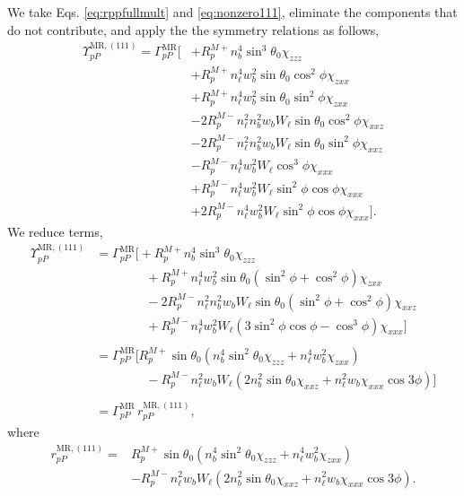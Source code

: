 We take Eqs. \eqref{eq:rppfullmult} and \eqref{eq:nonzero111}, eliminate the
components that do not contribute, and apply the the symmetry relations as
follows,
\begin{equation*}
\begin{split}
\Upsilon^{\mathrm{MR},(111)}_{pP} =
\Gamma^{\mathrm{MR}}_{pP}
\big[
&+ R^{M+}_{p}n^{4}_{b}\sin^{3}\theta_{0}\chi_{zzz}\\
&+ R^{M+}_{p}n^{4}_{\ell}w^{2}_{b}\sin\theta_{0}\cos^{2}\phi\chi_{zxx}\\
&+ R^{M+}_{p}n^{4}_{\ell}w^{2}_{b}\sin\theta_{0}\sin^{2}\phi\chi_{zxx}\\
&- 2R^{M-}_{p}n^{2}_{\ell}n^{2}_{b}w_{b}W_{\ell}\sin\theta_{0}\cos^{2}\phi
   \chi_{xxz}\\
&- 2R^{M-}_{p}n^{2}_{\ell}n^{2}_{b}w_{b}W_{\ell}\sin\theta_{0}\sin^{2}\phi
   \chi_{xxz}\\
&- R^{M-}_{p}n^{4}_{\ell}w^{2}_{b}W_{\ell}\cos^{3}\phi\chi_{xxx}\\
&+ R^{M-}_{p}n^{4}_{\ell}w^{2}_{b}W_{\ell}\sin^{2}\phi\cos\phi\chi_{xxx}\\
&+ 2R^{M-}_{p}n^{4}_{\ell}w^{2}_{b}W_{\ell}\sin^{2}\phi\cos\phi\chi_{xxx}
\big].
\end{split}
\end{equation*}
We reduce terms,
\begin{equation*}
\begin{split}
\Upsilon^{\mathrm{MR},(111)}_{pP} &=
\Gamma^{\mathrm{MR}}_{pP}
\big[
+ R^{M+}_{p}n^{4}_{b}\sin^{3}\theta_{0}\chi_{zzz}\\
&\qquad\qquad+ R^{M+}_{p}n^{4}_{\ell}w^{2}_{b}\sin\theta_{0}
   (\sin^{2}\phi+\cos^{2}\phi)\chi_{zxx}\\
&\qquad\qquad- 2R^{M-}_{p}n^{2}_{\ell}n^{2}_{b}w_{b}W_{\ell}\sin\theta_{0}
   (\sin^{2}\phi+\cos^{2}\phi)\chi_{xxz}\\
&\qquad\qquad+ R^{M-}_{p}n^{4}_{\ell}w^{2}_{b}W_{\ell}
   (3\sin^{2}\phi\cos\phi - \cos^{3}\phi)\chi_{xxx}
\big]\\\\
&=
\Gamma^{\mathrm{MR}}_{pP}
\big[
R^{M+}_{p}\sin\theta_{0}(n^{4}_{b}\sin^{2}\theta_{0}\chi_{zzz} 
+ n^{4}_{\ell}w^{2}_{b}\chi_{zxx})\\
&\qquad\qquad- R^{M-}_{p}n^{2}_{\ell}w_{b}W_{\ell}(2n^{2}_{b}\sin\theta_{0}
\chi_{xxz}
+ n^{2}_{\ell}w_{b}\chi_{xxx}\cos3\phi)
\big]\\\\
& = \Gamma^{\mathrm{MR}}_{pP}\,r^{\mathrm{MR},(111)}_{pP},
\end{split}
\end{equation*}
where
\begin{equation}
\boxed{
\begin{split}
r^{\mathrm{MR},(111)}_{pP} = 
&R^{M+}_{p}\sin\theta_{0}(n^{4}_{b}\sin^{2}\theta_{0}\chi_{zzz} 
+ n^{4}_{\ell}w^{2}_{b}\chi_{zxx})\\
&- R^{M-}_{p}n^{2}_{\ell}w_{b}W_{\ell}(2n^{2}_{b}\sin\theta_{0}\chi_{xxz}
+ n^{2}_{\ell}w_{b}\chi_{xxx}\cos3\phi).
\end{split}
}
\end{equation}

